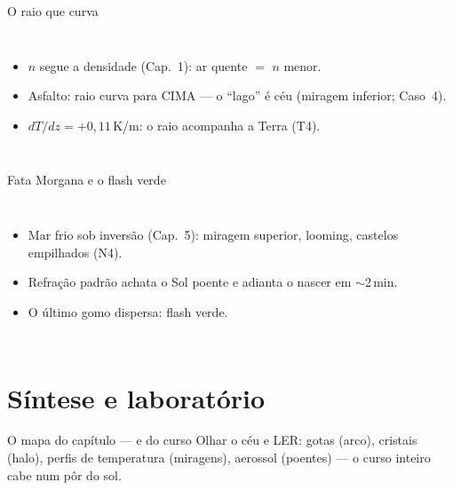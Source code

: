 \documentclass[aspectratio=169,11pt]{beamer}
\begin{document}
\begin{frame}{O raio que curva}
  \begin{columns}
    \vspace{0.4em}
    \begin{itemize}
      \item $n$ segue a densidade (Cap.~1): ar quente $=$ $n$ menor.
      \item Asfalto: raio curva para CIMA — o ``lago'' é céu
            (miragem inferior; Caso~4).
      \item $dT/dz = +0{,}11$\,K/m: o raio acompanha a Terra (T4).
    \end{itemize}
  \end{columns}
\end{frame}

\begin{frame}{Fata Morgana e o flash verde}
  \begin{columns}
    \begin{itemize}
      \item Mar frio sob inversão (Cap.~5): miragem superior,
            looming, castelos empilhados (N4).
      \item Refração padrão achata o Sol poente e adianta o nascer
            em $\sim$2\,min.
      \item O último gomo dispersa: \alert{flash verde}.
    \end{itemize}
  \end{columns}
\end{frame}

\section{Síntese e laboratório}

\begin{frame}{O mapa do capítulo — e do curso}
  \vspace{0.6em}
  Olhar o céu e LER: gotas (arco), cristais (halo), perfis de
  temperatura (miragens), aerossol (poentes) — o curso inteiro cabe
  num pôr do sol.
\end{frame}
\end{document}
